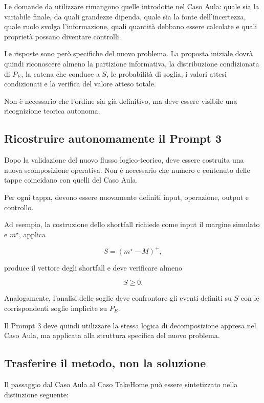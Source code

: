 Le domande da utilizzare rimangono quelle introdotte nel Caso Aula: quale sia
la variabile finale, da quali grandezze dipenda, quale sia la fonte
dell'incertezza, quale ruolo svolga l'informazione, quali quantit\`{a} debbano
essere calcolate e quali propriet\`{a} possano diventare controlli.

Le risposte sono per\`{o} specifiche del nuovo problema. La proposta iniziale
dovr\`{a} quindi riconoscere almeno la partizione informativa, la distribuzione
condizionata di $P_E$, la catena che conduce a $S$, le probabilit\`{a} di
soglia, i valori attesi condizionati e la verifica del valore atteso totale.

Non \`{e} necessario che l'ordine sia gi\`{a} definitivo, ma deve essere
visibile una ricognizione teorica autonoma.

\subsection{Ricostruire autonomamente il Prompt 3}

Dopo la validazione del nuovo flusso logico-teorico, deve essere costruita una nuova
scomposizione operativa. Non \`{e} necessario che numero e contenuto delle
tappe coincidano con quelli del Caso Aula.

Per ogni tappa, devono essere nuovamente definiti input, operazione, output e
controllo.

Ad esempio, la costruzione dello shortfall richiede come input il margine
simulato e $m^\star$, applica

\[
S=(m^\star-M)^+,
\]

\noindent produce il vettore degli shortfall e deve verificare almeno

\[
S\geq0.
\]

Analogamente, l'analisi delle soglie deve confrontare gli eventi definiti su
$S$ con le corrispondenti soglie implicite su $P_E$.

Il Prompt 3 deve quindi utilizzare la stessa logica di decomposizione appresa
nel Caso Aula, ma applicata alla struttura specifica del nuovo problema.

\subsection{Trasferire il metodo, non la soluzione}

Il passaggio dal Caso Aula al Caso TakeHome pu\`{o} essere sintetizzato nella
distinzione seguente:

